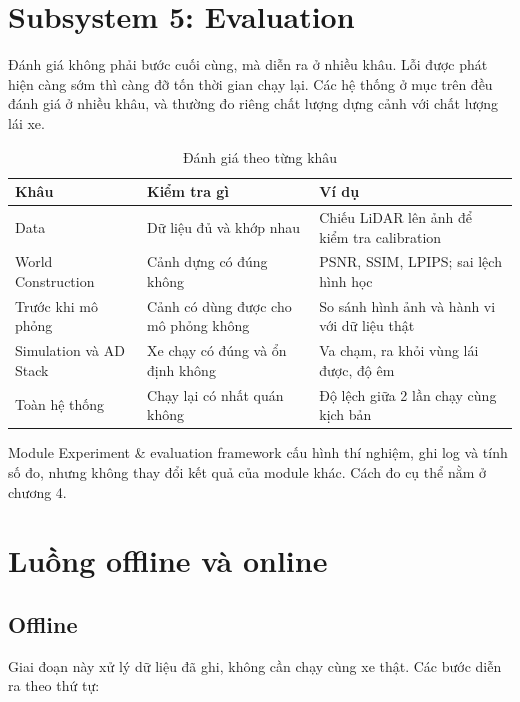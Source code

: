 \section{Subsystem 5: Evaluation}

Đánh giá không phải bước cuối cùng, mà diễn ra ở nhiều khâu. Lỗi được phát hiện càng sớm thì càng đỡ tốn thời gian chạy lại.
Các hệ thống ở mục trên đều đánh giá ở nhiều khâu, và thường đo riêng chất lượng dựng cảnh với chất lượng lái xe.

\begin{table}[H]
  \centering
  \small
  \caption{Đánh giá theo từng khâu}
  \begin{tabularx}{\linewidth}{>{\raggedright\arraybackslash}p{3cm} >{\raggedright\arraybackslash}X >{\raggedright\arraybackslash}X}
    \toprule
    \textbf{Khâu} & \textbf{Kiểm tra gì} & \textbf{Ví dụ} \\
    \midrule
    Data & Dữ liệu đủ và khớp nhau & Chiếu LiDAR lên ảnh để kiểm tra calibration \\
    \addlinespace
    World Construction & Cảnh dựng có đúng không & PSNR, SSIM, LPIPS; sai lệch hình học \\
    \addlinespace
    Trước khi mô phỏng & Cảnh có dùng được cho mô phỏng không & So sánh hình ảnh và hành vi với dữ liệu thật \\
    \addlinespace
    Simulation và AD Stack & Xe chạy có đúng và ổn định không & Va chạm, ra khỏi vùng lái được, độ êm \\
    \addlinespace
    Toàn hệ thống & Chạy lại có nhất quán không & Độ lệch giữa 2 lần chạy cùng kịch bản \\
    \bottomrule
  \end{tabularx}
\end{table}

Module Experiment \& evaluation framework cấu hình thí nghiệm, ghi log và tính số đo, nhưng không thay đổi kết quả của module khác. Cách đo cụ thể nằm ở chương 4.

\section{Luồng offline và online}

\subsection{Offline}

Giai đoạn này xử lý dữ liệu đã ghi, không cần chạy cùng xe thật. Các bước diễn ra theo thứ tự:

